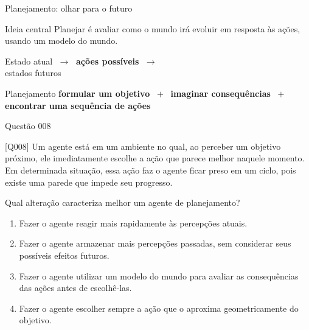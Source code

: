 \documentclass[xcolor=dvipsnames,table]{beamer}
\begin{document}
\begin{frame}{Planejamento: olhar para o futuro}
    \begin{block}{Ideia central}
        Planejar é avaliar como o mundo irá evoluir em resposta às ações,
        usando um modelo do mundo.
    \end{block}

    \begin{center}
        \Large
        Estado atual
        $\;\longrightarrow\;$
        \textbf{ações possíveis}
        $\;\longrightarrow\;$\\
        estados futuros
    \end{center}

    \begin{block}{Planejamento}
        \centering
        \textbf{formular um objetivo}
        $\;+\;$
        \textbf{imaginar consequências}
        $\;+\;$
        \textbf{encontrar uma sequência de ações}
    \end{block}
\end{frame}

\begin{frame}{Questão 008}
    \small

    \begin{block}{[Q008]}
        Um agente está em um ambiente no qual, ao perceber um objetivo
        próximo, ele imediatamente escolhe a ação que parece melhor
        naquele momento. Em determinada situação, essa ação faz o agente
        ficar preso em um ciclo, pois existe uma parede que impede seu
        progresso.

        Qual alteração caracteriza melhor um agente de planejamento?
    \end{block}

    \begin{enumerate}[label=(\Alph*)]
        \item Fazer o agente reagir mais rapidamente às percepções atuais.

        \item Fazer o agente armazenar mais percepções passadas,
        sem considerar seus possíveis efeitos futuros.

        \item Fazer o agente utilizar um modelo do mundo para avaliar
        as consequências das ações antes de escolhê-las.

        \item Fazer o agente escolher sempre a ação que o aproxima
        geometricamente do objetivo.
    \end{enumerate}
\end{frame}
\end{document}
